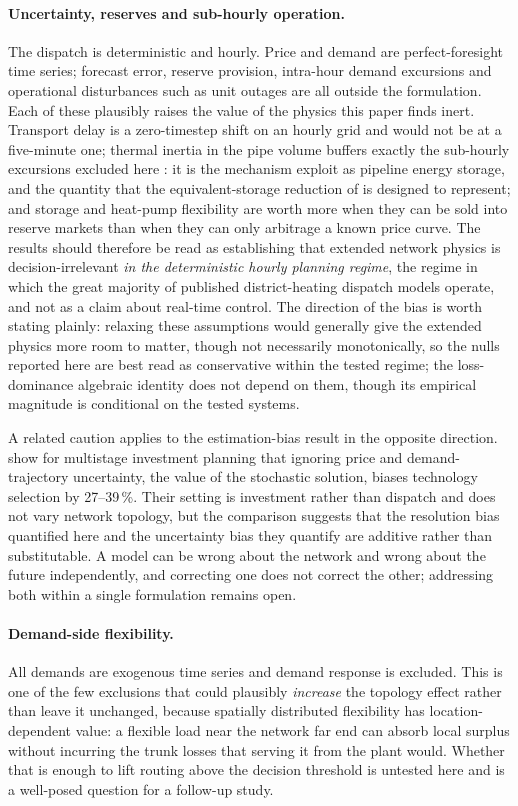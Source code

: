 \documentclass[a4paper,fleqn]{cas-sc}
\providecommand{\DIFadd}[1]{{\protect\color[HTML]{1A5FB4} #1}} %
\providecommand{\DIFaddbegin}{} %
\providecommand{\DIFaddend}{} %
\newcommand{\DIFaddincludegraphics}[2][]{{\color{blue}\fbox{\DIFOincludegraphics[#1]{#2}}}} %
\DeclareRobustCommand{\DIFaddbegin}{\DIFOaddbegin \let\includegraphics\DIFaddincludegraphics} %
\DeclareRobustCommand{\DIFaddend}{\DIFOaddend \let\includegraphics\DIFOincludegraphics} %
\begin{document}
\paragraph{Uncertainty, reserves and sub-hourly operation.}
The dispatch is deterministic and hourly. Price and demand are perfect-foresight time
series; forecast error, reserve provision, intra-hour demand excursions and operational
disturbances such as unit outages are all outside the formulation. Each of these plausibly
raises the value of the physics this paper finds inert. Transport delay is a zero-timestep
shift on an hourly grid and would not be at a five-minute one; thermal inertia in the pipe
volume buffers exactly the sub-hourly excursions excluded here\DIFaddbegin \DIFadd{: it is the mechanism
}\citet{Li2016_pipeline} \DIFadd{exploit as pipeline energy storage, and the quantity that the
equivalent-storage reduction of }\citet{Yang2024_equivalent} \DIFadd{is designed to represent}\DIFaddend ; and storage and heat-pump
flexibility are worth more when they can be sold into reserve markets than when they can
only arbitrage a known price curve. The results should therefore be read as establishing
that extended network physics is decision-irrelevant \emph{in the deterministic hourly
planning regime}, the regime in which the great majority of published district-heating
dispatch models operate, and not as a claim about real-time control. The direction of
the bias is worth stating plainly: relaxing these assumptions would generally give the
extended physics more room to matter, though not necessarily monotonically, so the nulls
reported here are best read as conservative within the tested regime; the loss-dominance
algebraic identity does not depend on them, though its empirical magnitude is conditional on
the tested systems.

A related caution applies to the estimation-bias result in the opposite direction.
\citet{Koek2026} show for multistage investment planning that ignoring price and
demand-trajectory uncertainty, the value of the stochastic solution, biases technology
selection by 27--39\,\%. Their setting is investment rather than dispatch and does not
vary network topology, but the comparison suggests that the resolution bias quantified
here and the uncertainty bias they quantify are additive rather than substitutable. A
model can be wrong about the network and wrong about the future independently, and
correcting one does not correct the other; addressing both within a single formulation
remains open.

\paragraph{Demand-side flexibility.}
All demands are exogenous time series and demand response is excluded. This is one of the
few exclusions that could plausibly \emph{increase} the topology effect rather than leave
it unchanged, because spatially distributed flexibility has location-dependent value: a
flexible load near the network far end can absorb local surplus without incurring the
trunk losses that serving it from the plant would. Whether that is enough to lift routing
above the decision threshold is untested here and is a well-posed question for a follow-up
study.
\end{document}
